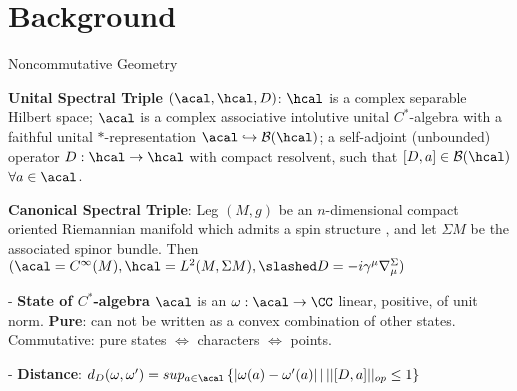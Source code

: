 \section{Background}

\begin{frame}{Noncommutative Geometry} %
    
    \textbf{Unital Spectral Triple} $(\acal , \hcal, D)$: $\hcal$ is a complex separable Hilbert space; $\acal$ is a complex associative intolutive unital $C^*$-algebra with a faithful unital $*$-representation $\acal \hookrightarrow \mathcal B(\hcal)$; a self-adjoint (unbounded) operator $D: \hcal \to \hcal$ with compact resolvent, such that $[D, a] \in \mathcal B(\hcal)$ $\forall a \in \acal$.
    
    \textbf{Canonical Spectral Triple}: Leg $(M, g)$ be an $n$-dimensional compact oriented Riemannian manifold which admits a spin structure%
    , and let $\Sigma M$%
    be the associated spinor bundle. Then $(\acal = C^\infty(M), \hcal = L^2(M, \Sigma M), \slashed D = -i \gamma^\mu \nabla^\Sigma_\mu)$%
    
    - \textbf{State of $C^*$-algebra} $\acal$ is an $\omega : \acal \to \CC$ linear, positive, of unit norm. \textbf{Pure}: can not be written as a convex combination of other states. Commutative: pure states $\Longleftrightarrow$ characters $\Longleftrightarrow$ points.
    
    - \textbf{Distance}: $d_D(\omega, \omega') = sup_{a \in \acal} \left\{|\omega(a) - \omega'(a)| \, | \, ||[D, a]||_{op} \leq 1 \right\}$
    
\end{frame}


